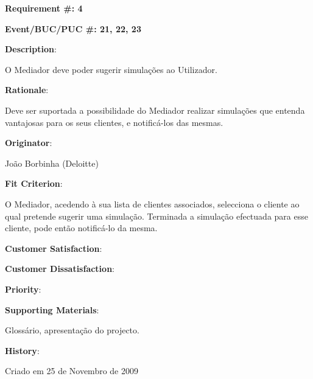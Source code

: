 \begin{minipage}{0.55\textwidth}
\begin{flushleft}\textbf{Requirement \#: 4}\end{flushleft}
\end{minipage}
\begin{minipage}{0.4\textwidth}
\begin{flushright}\textbf{Event/BUC/PUC \#: 21, 22, 23}\end{flushright}
\end{minipage}

\begin{description}
\item \textbf{Description}:

O Mediador deve poder sugerir simulações ao Utilizador.\\

\item \textbf{Rationale}:

Deve ser suportada a possibilidade do Mediador realizar simulações que entenda vantajosas para os seus clientes, e notificá-los das mesmas.\\

\item \textbf{Originator}:

João Borbinha (Deloitte)\\

\item \textbf{Fit Criterion}:

O Mediador, acedendo à sua lista de clientes associados, selecciona o cliente ao qual pretende sugerir uma simulação. Terminada a simulação efectuada para esse cliente, pode então notificá-lo da mesma.\\

\begin{minipage}{0.45\textwidth}
\begin{flushleft}\item \textbf{Customer Satisfaction}:\end{flushleft}
\end{minipage}
\begin{minipage}{0.45\textwidth}
\begin{flushleft}\item \textbf{Customer Dissatisfaction}:\end{flushleft}
\end{minipage}

\item \textbf{Priority}:\\

\item \textbf{Supporting Materials}:

Glossário, apresentação do projecto.\\

\item \textbf{History}:

Criado em 25 de Novembro de 2009\\
\end{description}

